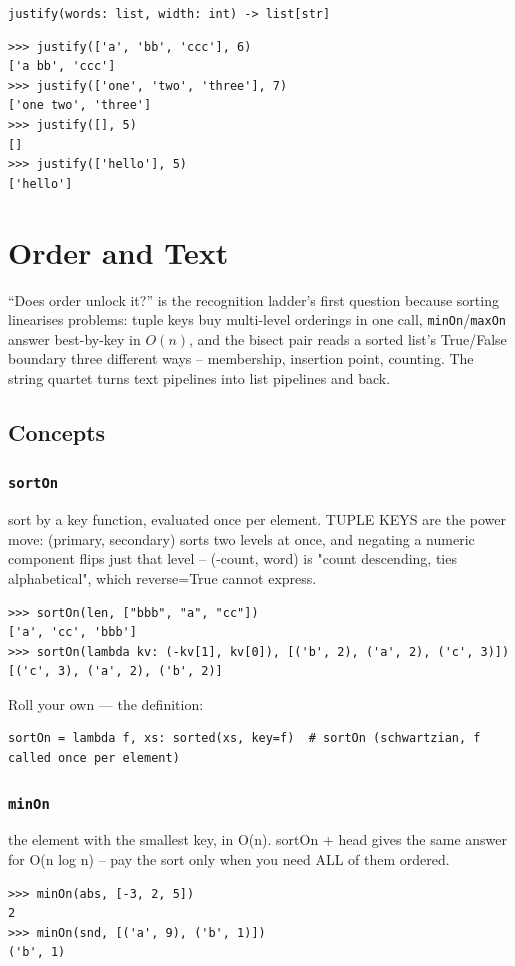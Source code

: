 \documentclass[10pt,letterpaper]{book}
\begin{document}
\noindent\texttt{justify(words: list, width: int) -> list[str]}
\begin{lstlisting}[style=ex]
>>> justify(['a', 'bb', 'ccc'], 6)
['a bb', 'ccc']
>>> justify(['one', 'two', 'three'], 7)
['one two', 'three']
>>> justify([], 5)
[]
>>> justify(['hello'], 5)
['hello']
\end{lstlisting}

\clearpage
\chapter{Order and Text}

``Does order unlock it?'' is the recognition ladder's first question because
sorting linearises problems: tuple keys buy multi-level orderings in one
call, \texttt{minOn}/\texttt{maxOn} answer best-by-key in $O(n)$, and the
bisect pair reads a sorted list's True/False boundary three different ways
-- membership, insertion point, counting. The string quartet turns text
pipelines into list pipelines and back.
\section{Concepts}
\subsection{\texttt{sortOn}}\label{def:sortOn}
sort by a key function, evaluated once per element. TUPLE KEYS are the power move: (primary, secondary) sorts two levels at once, and negating a numeric component flips just that level -- (-count, word) is "count descending, ties alphabetical", which reverse=True cannot express.
\begin{lstlisting}[style=ex]
>>> sortOn(len, ["bbb", "a", "cc"])
['a', 'cc', 'bbb']
>>> sortOn(lambda kv: (-kv[1], kv[0]), [('b', 2), ('a', 2), ('c', 3)])
[('c', 3), ('a', 2), ('b', 2)]
\end{lstlisting}

Roll your own --- the definition:

\begin{lstlisting}[style=ex]
sortOn = lambda f, xs: sorted(xs, key=f)  # sortOn (schwartzian, f called once per element)
\end{lstlisting}
\subsection{\texttt{minOn}}\label{def:minOn}
the element with the smallest key, in O(n). sortOn + head gives the same answer for O(n log n) -- pay the sort only when you need ALL of them ordered.
\begin{lstlisting}[style=ex]
>>> minOn(abs, [-3, 2, 5])
2
>>> minOn(snd, [('a', 9), ('b', 1)])
('b', 1)
\end{lstlisting}
\end{document}
